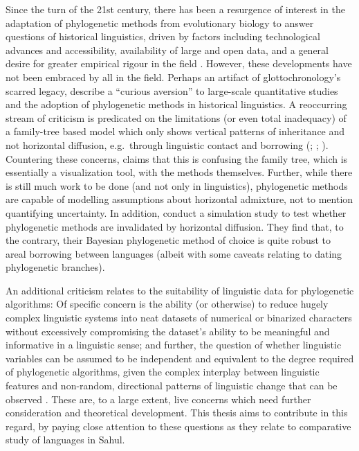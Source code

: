 Since the turn of the 21st century, there has been a resurgence of interest in the adaptation of phylogenetic methods from evolutionary biology to answer questions of historical linguistics, driven by factors including technological advances and accessibility, availability of large and open data, and a general desire for greater empirical rigour in the field \autocites{atkinson_curious_2005}{mcmahon_finding_2003}{nunn_comparative_2011}. However, these developments have not been embraced by all in the field. Perhaps an artifact of glottochronology's scarred legacy, \textcite[p.~520]{atkinson_curious_2005} describe a ``curious aversion'' to large-scale quantitative studies and the adoption of phylogenetic methods in historical linguistics. A reoccurring stream of criticism is predicated on the limitations (or even total inadequacy) of a family-tree based model which only shows vertical patterns of inheritance and not horizontal diffusion, e.g.~through linguistic contact and borrowing (\textcite{bateman_speaking_1990}; \textcite{donohue_new_2012}; \textcite{gould_urchin_2010}). Countering these concerns, \textcite{bowern_historical_2010} claims that this is confusing the family tree, which is essentially a visualization tool, with the methods themselves. Further, while there is still much work to be done (and not only in linguistics), phylogenetic methods are capable of modelling assumptions about horizontal admixture, not to mention quantifying uncertainty. In addition, \textcite{greenhill_does_2009} conduct a simulation study to test whether phylogenetic methods are invalidated by horizontal diffusion. They find that, to the contrary, their Bayesian phylogenetic method of choice is quite robust to areal borrowing between languages (albeit with some caveats relating to dating phylogenetic branches).

An additional criticism relates to the suitability of linguistic data for phylogenetic algorithms: Of specific concern is the ability (or otherwise) to reduce hugely complex linguistic systems into neat datasets of numerical or binarized characters without excessively compromising the dataset's ability to be meaningful and informative in a linguistic sense; and further, the question of whether linguistic variables can be assumed to be independent and equivalent to the degree required of phylogenetic algorithms, given the complex interplay between linguistic features and non-random, directional patterns of linguistic change that can be observed \autocite{heggarty_interdisciplinary_2006}. These are, to a large extent, live concerns which need further consideration and theoretical development. This thesis aims to contribute in this regard, by paying close attention to these questions as they relate to comparative study of languages in Sahul.

